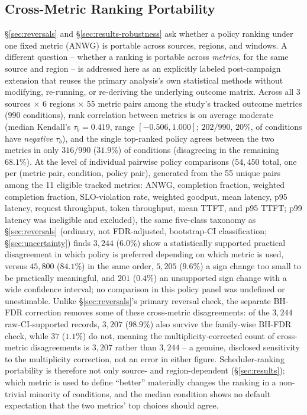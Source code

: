 \subsection{Cross-Metric Ranking Portability}
\label{sec:results-cross-metric}

\S\ref{sec:reversals} and \S\ref{sec:results-robustness} ask whether a
policy ranking under one fixed metric (ANWG) is portable across sources,
regions, and windows. A different question -- whether a ranking is
portable across \emph{metrics}, for the same source and region -- is
addressed here as an explicitly labeled post-campaign extension that
reuses the primary analysis's own statistical methods without modifying,
re-running, or re-deriving the underlying outcome matrix. Across all $3$
sources $\times$ $6$ regions $\times$ $55$
metric pairs among the study's tracked outcome metrics ($990$ conditions),
rank correlation between metrics is on average moderate (median Kendall's
$\tau_b = 0.419$, range $[-0.506, 1.000]$; $202/990$, $20\%$, of conditions
have \emph{negative} $\tau_b$), and the single top-ranked policy agrees
between the two metrics in only $316/990$ ($31.9\%$) of conditions
(disagreeing in the remaining $68.1\%$). At the level of individual
pairwise policy comparisons ($54{,}450$ total, one per (metric pair, condition, policy pair), generated from the 55 unique pairs among the 11 eligible tracked metrics: ANWG, completion fraction, weighted completion fraction, SLO-violation rate, weighted goodput, mean latency, p95 latency, request throughput, token throughput, mean TTFT, and p95 TTFT; p99 latency was ineligible and excluded), the same five-class taxonomy as \S\ref{sec:reversals} (ordinary, not
FDR-adjusted, bootstrap-CI classification; \S\ref{sec:uncertainty}) finds $3{,}244$ ($6.0\%$) show a statistically
supported practical disagreement in which
policy is preferred depending on which metric is used, versus $45{,}800$
($84.1\%$) in the same order, $5{,}205$ ($9.6\%$) a sign change too small
to be practically meaningful, and $201$ ($0.4\%$) an unsupported sign
change with a wide confidence interval; no comparison in this policy panel
was undefined or unestimable. Unlike \S\ref{sec:reversals}'s primary
reversal check, the separate BH-FDR correction removes some of these
cross-metric disagreements: of the $3{,}244$ raw-CI-supported records,
$3{,}207$ ($98.9\%$) also survive the family-wise BH-FDR check, while
$37$ ($1.1\%$) do not, meaning the multiplicity-corrected count of
cross-metric disagreements is $3{,}207$ rather than $3{,}244$ -- a genuine,
disclosed sensitivity to the multiplicity correction, not an error in
either figure. Scheduler-ranking portability is
therefore not only source- and region-dependent (\S\ref{sec:results});
which metric is used to define ``better'' materially changes the ranking
in a non-trivial minority of conditions, and the median condition shows no
default expectation that the two metrics' top choices should agree.

